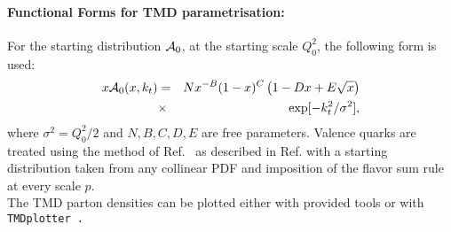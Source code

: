 \paragraph{Functional Forms for TMD parametrisation:} \rm

For the starting distribution ${\cal A}_0$, at the starting scale $Q_0^2$, 
the following form is used:
\begin{eqnarray}
x{\cal A}_0(x,\kt) &=& N x^{-B}(1 -x)^{C}\left(1 -D x 
+ E \sqrt{x}   \right) \nonumber\\
   &\times &\exp[ - k_t^2 / \sigma^2 ], 
\label{a0-5par}
\end{eqnarray}
where $ \sigma^2  =  Q_0^2 / 2 $ and $N, B, C, D, E$ are free parameters.
Valence quarks are treated using the method of Ref.~\cite{Deak:2010gk} as described 
in Ref. \cite{Hautmann:2013tba} with a starting distribution taken from any collinear PDF
and imposition of the flavor sum rule at every scale $p$.
\\
The TMD parton densities can be plotted either with \fitter provided tools 
or with \tt TMDplotter\rm~\cite{tmdlref}.


